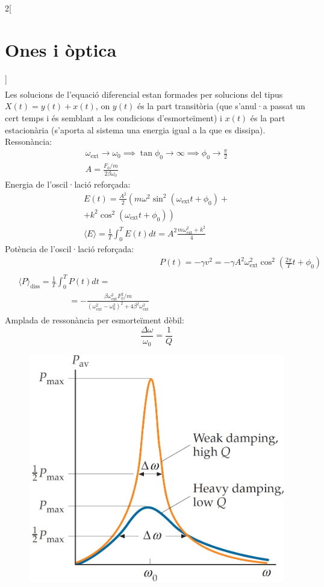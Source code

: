 \documentclass[class=article,10pt,crop=false]{standalone}
\begin{document}
\begin{multicols}{2}[\section{Ones i òptica}]
\begin{gather*}
\end{gather*}
{\footnotesize Les solucions de l'equació diferencial estan formades per solucions del tipus $X(t)=y(t)+x(t)$, on $y(t)$ és la part transitòria (que s'anul·a passat un cert temps i és semblant a les condicions d'esmorteïment) i $x(t)$ és la part estacionària (s'aporta al sistema una energia igual a la que es dissipa).}\newline
Ressonància:
\begin{gather*}
    \omega_{\text{ext}}\to\omega_0\implies\tan\phi_0\to\infty\implies\phi_0\to\frac{\pi}{2}\\
    A=\frac{F_0/m}{2\beta\omega_0}
\end{gather*}
Energia de l'oscil·lació reforçada:
\begin{multline*}
    E(t)=\frac{A^2}{2}\left(m\omega^2\sin^2(\omega_{\text{ext}}t+\phi_0)+\right.\\\left.+k^2\cos^2(\omega_{\text{ext}}t+\phi_0)\right)\\
    \langle E\rangle=\frac{1}{T}\int_0^TE(t)dt=A^2\frac{m\omega_{\text{ext}}^2+k^2}{4}
\end{multline*}
Potència de l'oscil·lació reforçada:
\begin{align*}
    &P(t)=-\gamma v^2=-\gamma A^2\omega_{\text{ext}}^2\cos^2\left(\frac{2\pi}{T}t+\phi_0\right)\\
    \begin{split}
        &\langle P\rangle_{\text{diss}}=\frac{1}{T}\int_0^TP(t)dt=\\&\qquad\qquad\qquad=-\frac{\beta\omega_\text{ext}^2F_0^2/m}{(\omega_\text{ext}^2-\omega_0^2)^2+4\beta^2\omega_\text{ext}^2}
    \end{split}
\end{align*}
Amplada de ressonància per esmorteïment dèbil:
$$\frac{\Delta\omega}{\omega_0}=\frac{1}{Q}$$
\begin{figure}
   \centering
   \includegraphics[width=\linewidth]{Physics/1st/Ones_i_optica/Imatges/q.jpg}

\end{figure}
\end{multicols}
\end{document}
